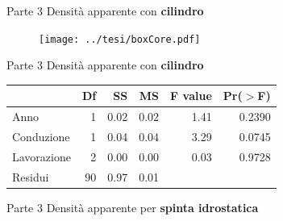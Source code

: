 \documentclass[10pt]{beamer}
\begin{document}
\begin{frame}
\end{frame}


\begin{frame}[label=Core]{Parte 3 \small{Densità apparente con \bf{cilindro}}}
  \hyperlink{finale}{}  
  \begin{figure}
    \texttt{[image: ../tesi/boxCore.pdf]}
  \end{figure}
\end{frame}

\begin{frame}{Parte 3 \small{Densità apparente con \bf{cilindro}} }
  \begin{table}[ht]
    \centering
    \label{tab:anova del modello}
    \begin{tabular}{lrrrrr}
      \hline
      & Df & SS & MS & F value & Pr($>$F) \\ 
      \hline 
      Anno         & 1  &  0.02  &  0.02  &   1.41   & 0.2390   \\ 
      Conduzione   & 1  &  0.04  &  0.04  &   3.29   & 0.0745   \\ 
      Lavorazione  & 2  &  0.00  &  0.00  &   0.03   & 0.9728   \\ 
      Residui      & 90 &  0.97  &  0.01  &          &          \\ 
      \hline
    \end{tabular}
  \end{table}
\end{frame}

\begin{frame}[label=Clod]{Parte 3 \small{Densità apparente per \bf{spinta
        idrostatica}}} 
  \hyperlink{finale}{}
\end{frame}
\end{document}
